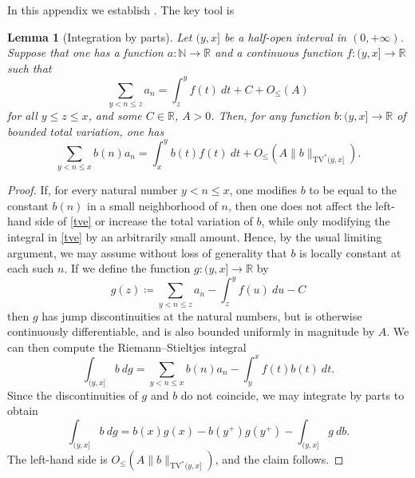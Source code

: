 \documentclass[10pt,a4paper,reqno]{amsart}
\numberwithin{equation}{section}
\theoremstyle{plain}
\newtheorem{lemma}[lemma]{Lemma}
\theoremstyle{definition}
\newcommand\R{\mathbb{R}}
\newcommand\N{\mathbb{N}}
\begin{document}
In this appendix we establish .  The key tool is

\begin{lemma}[Integration by parts]\label{integ-lemma}  Let $(y,x]$ be a half-open interval in $(0,+\infty)$.  Suppose that one has a function $a \colon \N \to \R$ and a continuous function $f: (y,x] \to \R$ such that
  $$ \sum_{y < n \leq z} a_n = \int_z^y f(t)\ dt + C + O_{\leq}(A)$$
  for all $y \leq z \leq x$, and some $C \in \R$, $A>0$.  Then, for any function $b: (y,x] \to \R$ of bounded total variation, one has
\begin{equation}\label{tve}
   \sum_{y < n \leq x} b(n) a_n = \int_x^y b(t) f(t)\ dt + O_{\leq}(A\|b\|_{\mathrm{TV}^*(y,x]}).
\end{equation}
\end{lemma}

\begin{proof}  If, for every natural number $y < n \leq x$, one modifies $b$ to be equal to the constant $b(n)$ in a small neighborhood of $n$, then one does not affect the left-hand side of \eqref{tve} or increase the total variation of $b$, while only modifying the integral in \eqref{tve} by an arbitrarily small amount.  Hence, by the usual limiting argument, we may assume without loss of generality that $b$ is locally constant at each such $n$.  If we define the function $g \colon (y,x] \to \R$ by
$$ g(z) \coloneqq  \sum_{y < n \leq z} a_n - \int_z^y f(u)\ du - C$$
then $g$ has jump discontinuities at the natural numbers, but is otherwise continuously differentiable, and is also bounded uniformly in magnitude by $A$.  We can then compute the Riemann--Stieltjes integral
$$ \int_{(y,x]} b\ dg = \sum_{y < n \leq x} b(n) a_n - \int_y^x f(t) b(t)\ dt.$$
Since the discontinuities of $g$ and $b$ do not coincide, we may integrate by parts to obtain
$$ \int_{(y,x]} b\ dg = b(x) g(x) - b(y^+) g(y^+) - \int_{(y,x]} g\ db.$$
The left-hand side is $O_{\leq}(A \|b\|_{\mathrm{TV}^*(y,x]})$, and the claim follows.
\end{proof}
\end{document}
